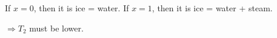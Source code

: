 If \( x = 0 \), then it is ice = water.  
If \( x = 1 \), then it is ice = water + steam.  

\( \Rightarrow T_2 \) must be lower.